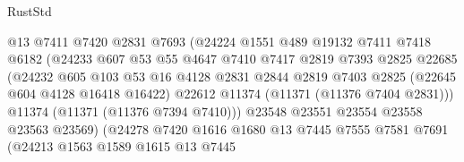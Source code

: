 \begin{lexlean}{RustStd}
\begin{coremodule}
                                @13
                                @7411
                                @7420
                                @2831
                                @7693
                                (@24224
                                  @1551
                                  @489
                                  @19132
                                  @7411
                                  @7418
                                  @6182
                                  (@24233
                                    @607
                                    @53
                                    @55
                                    @4647
                                    @7410
                                    @7417
                                    @2819
                                    @7393
                                    @2825
                                    @22685
                                    (@24232
                                      @605
                                      @103
                                      @53
                                      @16
                                      @4128
                                      @2831
                                      @2844
                                      @2819
                                      @7403
                                      @2825
                                      (@22645 @604 @4128 @16418 @16422)
                                      @22612
                                      @11374
                                      (@11371 (@11376 @7404 @2831)))
                                    @11374
                                    (@11371 (@11376 @7394 @7410)))
                                  @23548
                                  @23551
                                  @23554
                                  @23558
                                  @23563
                                  @23569)
                                (@24278
                                  @7420
                                  @1616
                                  @1680
                                  @13
                                  @7445
                                  @7555
                                  @7581
                                  @7691
                                  (@24213
                                    @1563
                                    @1589
                                    @1615
                                    @13
                                    @7445

\end{coremodule}
\end{lexlean}
